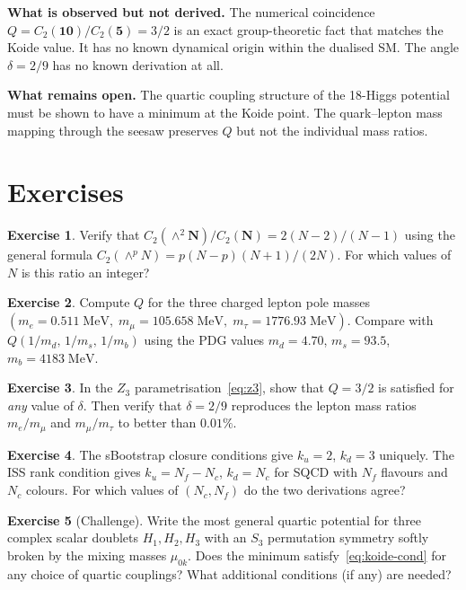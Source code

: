 \documentclass[11pt,a4paper]{article}
\newcommand{\Nc}{N_{\!c}}
\newcommand{\Nf}{N_{\!f}}
\theoremstyle{definition}\newtheorem{exercise}{Exercise}[section]
\begin{document}
\textbf{What is observed but not derived.}  The numerical
coincidence $Q = C_2(\mathbf{10})/C_2(\mathbf{5}) = 3/2$ is an
exact group-theoretic fact that matches the Koide value.
It has no known dynamical origin within the dualised SM.
The angle $\delta = 2/9$ has no known derivation at all.

\textbf{What remains open.}  The quartic coupling structure
of the 18-Higgs potential must be shown to have a minimum at
the Koide point.  The quark--lepton mass mapping through the
seesaw preserves $Q$ but not the individual mass ratios.

\section{Exercises}
\label{sec:exercises}

\begin{exercise}
Verify that $C_2(\wedge^2\mathbf{N})/C_2(\mathbf{N})
= 2(N-2)/(N-1)$ using the general formula
$C_2(\wedge^p N) = p(N-p)(N+1)/(2N)$.  For which values
of $N$ is this ratio an integer?
\end{exercise}

\begin{exercise}
Compute $Q$ for the three charged lepton pole masses
$(m_e = 0.511\;\text{MeV},\; m_\mu = 105.658\;\text{MeV},\;
m_\tau = 1776.93\;\text{MeV})$.  Compare with
$Q(1/m_d,\,1/m_s,\,1/m_b)$ using the PDG values
$m_d = 4.70$, $m_s = 93.5$, $m_b = 4183\;\text{MeV}$.
\end{exercise}

\begin{exercise}
In the $Z_3$ parametrisation~\eqref{eq:z3}, show that
$Q = 3/2$ is satisfied for \emph{any} value of $\delta$.
Then verify that $\delta = 2/9$ reproduces the lepton mass
ratios $m_e/m_\mu$ and $m_\mu/m_\tau$ to better than
$0.01\%$.
\end{exercise}

\begin{exercise}
The sBootstrap closure conditions give $k_u = 2$, $k_d = 3$
uniquely.  The ISS rank condition gives
$k_u = \Nf - \Nc$, $k_d = \Nc$ for SQCD with $\Nf$ flavours
and $\Nc$ colours.  For which values of $(\Nc, \Nf)$ do the
two derivations agree?
\end{exercise}

\begin{exercise}[Challenge]
Write the most general quartic potential for three complex
scalar doublets $H_1, H_2, H_3$ with an $S_3$ permutation
symmetry softly broken by the mixing masses $\mu_{0k}$.
Does the minimum satisfy~\eqref{eq:koide-cond} for any
choice of quartic couplings?  What additional conditions
(if any) are needed?
\end{exercise}
\end{document}
